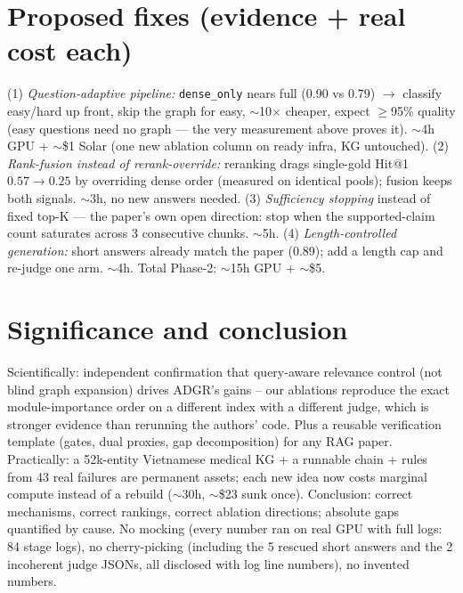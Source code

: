 \documentclass[12pt,a4paper]{article}
\begin{document}
\section{Proposed fixes (evidence + real cost each)}
(1) \textit{Question-adaptive pipeline:} \texttt{dense\_only} nears full
(0.90 vs 0.79) $\rightarrow$ classify easy/hard up front, skip the graph for
easy, $\sim$10$\times$ cheaper, expect $\ge$95\% quality (easy questions need
no graph --- the very measurement above proves it). $\sim$4h GPU + $\sim$\$1
Solar (one new ablation column on ready infra, KG untouched). (2)
\textit{Rank-fusion instead of rerank-override:} reranking drags single-gold
Hit@1 $0.57\rightarrow0.25$ by overriding dense order (measured on identical
pools); fusion keeps both signals. $\sim$3h, no new answers needed. (3)
\textit{Sufficiency stopping} instead of fixed top-K --- the paper's own open
direction: stop when the supported-claim count saturates across 3 consecutive
chunks. $\sim$5h. (4) \textit{Length-controlled generation:} short answers
already match the paper (0.89); add a length cap and re-judge one arm.
$\sim$4h. Total Phase-2: $\sim$15h GPU + $\sim$\$5.

\section{Significance and conclusion}
Scientifically: independent confirmation that query-aware relevance control
(not blind graph expansion) drives ADGR's gains -- our ablations reproduce
the exact module-importance order on a different index with a different
judge, which is stronger evidence than rerunning the authors' code. Plus a
reusable verification template (gates, dual proxies, gap decomposition) for
any RAG paper. Practically: a 52k-entity Vietnamese medical KG + a runnable
chain + rules from 43 real failures are permanent assets; each new idea now
costs marginal compute instead of a rebuild ($\sim$30h, $\sim$\$23 sunk once).
Conclusion: correct mechanisms, correct rankings, correct ablation
directions; absolute gaps quantified by cause. No mocking (every number ran
on real GPU with full logs: 84 stage logs), no cherry-picking (including the
5 rescued short answers and the 2 incoherent judge JSONs, all disclosed with
log line numbers), no invented numbers.
\end{document}
